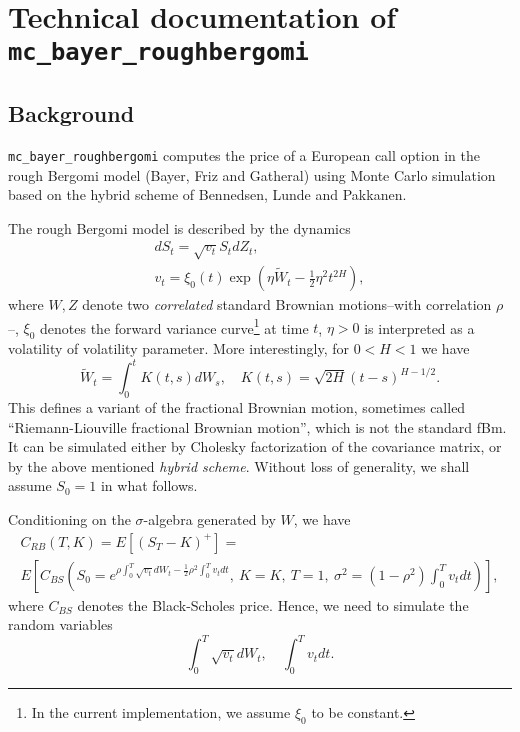 \documentclass[a4paper]{article}
\renewcommand{\tilde}[1]{\widetilde{#1}}
\begin{document}
\section*{Technical documentation of \texttt{mc\_bayer\_roughbergomi}}
\label{sec:techn-docum-verbmc_b}

\subsection*{Background}
\label{sec:background}

\texttt{mc\_bayer\_roughbergomi} computes the price of a European call option in
the rough Bergomi model (Bayer, Friz and Gatheral) using Monte Carlo
simulation based on the hybrid scheme of Bennedsen, Lunde and Pakkanen.

The rough Bergomi model is described by the dynamics
\begin{gather*}
  dS_t = \sqrt{v_t} S_t dZ_t,\\
  v_t = \xi_0(t) \exp\left( \eta \tilde{W}_t - \frac{1}{2} \eta^2 t^{2H} \right),
\end{gather*}
where $W, Z$ denote two \emph{correlated} standard Brownian motions--with
correlation $\rho$--, $\xi_0$ denotes the forward variance curve\footnote{In
  the current implementation, we assume $\xi_0$ to be constant.} at time $t$,
$\eta > 0$ is interpreted as a volatility of volatility parameter. More
interestingly, for $0 < H < 1$ we have
\begin{equation*}
  \tilde{W}_t = \int_0^t K(t,s) dW_s, \quad K(t,s) = \sqrt{2H} (t-s)^{H - 1/2}.
\end{equation*}
This defines a variant of the fractional Brownian motion, sometimes called
``Riemann-Liouville fractional Brownian motion'', which is not the standard
fBm. It can be simulated either by Cholesky factorization of the covariance
matrix, or by the above mentioned \emph{hybrid scheme}. Without loss of
generality, we shall assume $S_0 = 1$ in what follows.

Conditioning on the $\sigma$-algebra generated by $W$, we have
\begin{multline*}
  C_{RB}\left( T, K \right) = E\left[ \left(S_T - K \right)^+ \right] =\\
  E\left[C_{BS}\left( S_0 = e^{\rho \int_0^T \sqrt{v_t} dW_t - \frac{1}{2}
        \rho^2 \int_0^T v_t dt},\ K = K, \ T = 1, \ \sigma^2 = (1-\rho^2)
      \int_0^T v_t dt \right) \right],
\end{multline*}
where $C_{BS}$ denotes the Black-Scholes price. Hence, we need to simulate the
random variables
\begin{equation*}
  \int_0^T \sqrt{v_t} dW_t, \quad \int_0^T v_t dt.
\end{equation*}
\end{document}

